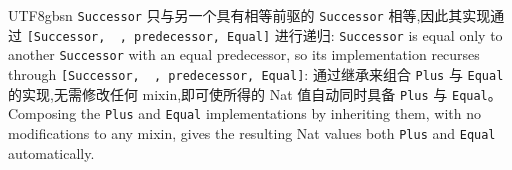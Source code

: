 \begin{CJK*}{UTF8}{gbsn}
\ifPaperChinese
  \texttt{Successor} 只与另一个具有相等前驱的 \texttt{Successor} 相等,因此其实现通过 \texttt{[Successor, ~, predecessor, Equal]} 进行递归:
  \else
  \texttt{Successor} is equal only to another \texttt{Successor} with an equal
  predecessor, so its implementation recurses through
  \texttt{[Successor, ~, predecessor, Equal]}:
  \fi
{}
\ifPaperChinese
通过继承来组合 \texttt{Plus} 与 \texttt{Equal} 的实现,无需修改任何 mixin,即可使所得的 Nat 值自动同时具备 \texttt{Plus} 与 \texttt{Equal}。
\else
Composing the \texttt{Plus} and \texttt{Equal} implementations by
inheriting them, with no modifications to any mixin, gives the
resulting Nat values both \texttt{Plus} and \texttt{Equal}
automatically.
\fi

\end{CJK*}
